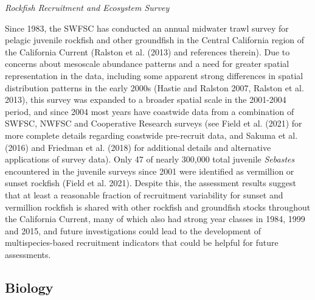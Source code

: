 \documentclass[11pt,
  english,
]{article}
\begin{document}
\emph{Rockfish Recruitment and Ecosystem Survey}

Since 1983, the SWFSC has conducted an annual midwater trawl survey for pelagic juvenile rockfish and other groundfish in the Central California region of the California Current (Ralston et al. {(2013)\leavevmode\tagmcend\tagstructend} and references therein). Due to concerns about mesoscale abundance patterns and a need for greater spatial representation in the data, including some apparent strong differences in spatial distribution patterns in the early 2000s {(Hastie and Ralston 2007, Ralston et al. 2013)\leavevmode\tagmcend\tagstructend}, this survey was expanded to a broader spatial scale in the 2001-2004 period, and since 2004 most years have coastwide data from a combination of SWFSC, NWFSC and Cooperative Research surveys (see Field et al. {(2021)\leavevmode\tagmcend\tagstructend} for more complete details regarding coastwide pre-recruit data, and Sakuma et al. {(2016)\leavevmode\tagmcend\tagstructend} and Friedman et al. {(2018)\leavevmode\tagmcend\tagstructend} for additional details and alternative applications of survey data). Only 47 of nearly 300,000 total juvenile \emph{Sebastes} encountered in the juvenile surveys since 2001 were identified as vermillion or sunset rockfish {(Field et al. 2021)\leavevmode\tagmcend\tagstructend}. Despite this, the assessment results suggest that at least a reasonable fraction of recruitment variability for sunset and vermillion rockfish is shared with other rockfish and groundfish stocks throughout the California Current, many of which also had strong year classes in 1984, 1999 and 2015, and future investigations could lead to the development of multispecies-based recruitment indicators that could be helpful for future assessments.


\hypertarget{biology}{%
\subsection{Biology}\label{biology}}

\leavevmode\tagmcend\tagstructend

\end{document}
